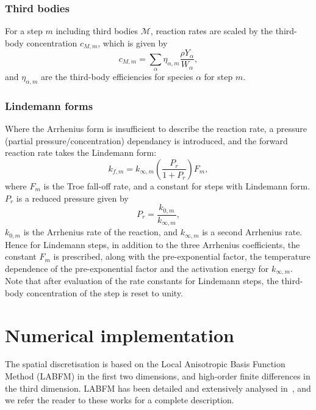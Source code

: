 \documentclass[notitlepage]{revtex4-1}
\begin{document}
\subsubsection{Third bodies}

For a step $m$ including third bodies $\mathcal{M}$, reaction rates are scaled by the third-body concentration $c_{M,m}$, which is given by
\begin{equation}c_{M,m}=\displaystyle\sum_{\alpha}\eta_{\alpha,m}\frac{\rho{Y}_{\alpha}}{W_{\alpha}},\end{equation}
and $\eta_{\alpha,m}$ are the third-body efficiencies for species $\alpha$ for step $m$.

\subsubsection{Lindemann forms}

Where the Arrhenius form is insufficient to describe the reaction rate, a pressure (partial pressure/concentration) dependancy is introduced, and the forward reaction rate takes the Lindemann form:
\begin{equation}k_{f,m}=k_{\infty,m}\left(\frac{P_{r}}{1+P_{r}}\right)F_{m},\end{equation}
where $F_{m}$ is the Troe fall-off rate, and a constant for steps with Lindemann form. $P_{r}$ is a reduced pressure given by
\begin{equation}P_{r}=\frac{k_{0,m}}{k_{\infty,m}},\end{equation}
$k_{0,m}$ is the Arrhenius rate of the reaction, and $k_{\infty,m}$ is a second Arrhenius rate. Hence for Lindemann steps, in addition to the three Arrhenius coefficients, the constant $F_{m}$ is prescribed, along with the pre-exponential factor, the temperature dependence of the pre-exponential factor and the activation energy for $k_{\infty,m}$. Note that after evaluation of the rate constants for Lindemann steps, the third-body concentration of the step is reset to unity.

\section{Numerical implementation}\label{ni}

The spatial discretisation is based on the Local Anisotropic Basis Function Method (LABFM) in the first two dimensions, and high-order finite differences in the third dimension. LABFM has been detailed and extensively analysed in~\cite{king_2020,king_2022}, and we refer the reader to these works for a complete description.
\end{document}
